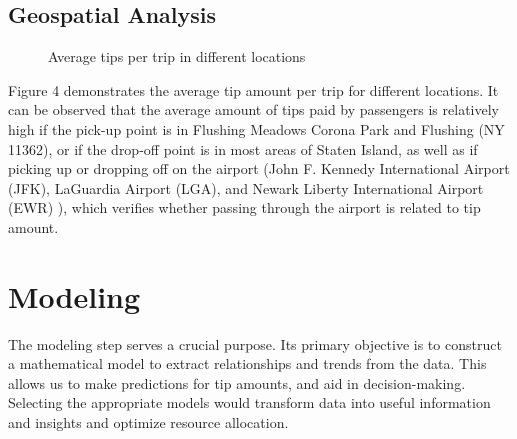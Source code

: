 \documentclass[11pt]{article}
\begin{document}
\subsection{Geospatial Analysis}

\begin{figure}[t]
    \centering
    \caption{Average tips per trip in different locations}
    \label{fig:foobar}
\end{figure}

Figure 4 demonstrates the average tip amount per trip for different locations. It can be observed that the average amount of tips paid by passengers is relatively high if the pick-up point is in Flushing Meadows Corona Park and Flushing (NY 11362), or if the drop-off point is in most areas of Staten Island, as well as if picking up or dropping off on the airport (John F. Kennedy International Airport (JFK), LaGuardia Airport (LGA), and Newark Liberty International Airport (EWR) ), which verifies whether passing through the airport is related to tip amount.

\section{Modeling}
The modeling step serves a crucial purpose. Its primary objective is to construct a mathematical model to extract relationships and trends from the data. This allows us to make predictions for tip amounts, and aid in decision-making. Selecting the appropriate models  would transform data into useful information and insights and optimize resource allocation. 
\end{document}
